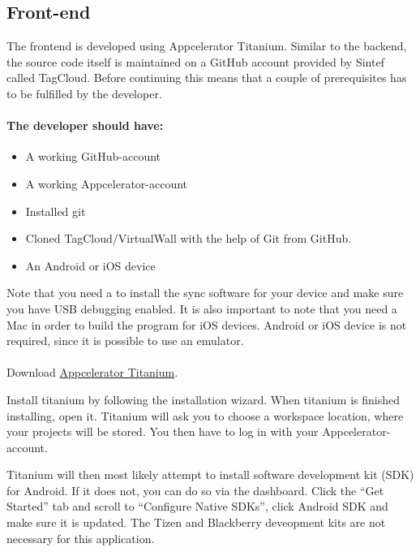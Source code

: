 \subsection{Front-end}

The frontend is developed using Appcelerator Titanium.  Similar to the backend, the source code itself is maintained on a GitHub account provided by Sintef called TagCloud. Before continuing this means that a couple of prerequisites has to be fulfilled by the developer.

\paragraph{The developer should have:}
\begin{itemize}
\item A working GitHub-account 
\item A working Appcelerator-account 
\item Installed git
\item Cloned TagCloud/VirtualWall with the help of Git from GitHub.
\item An Android or iOS device
\end{itemize}  

Note that you need a to install the sync software for your device and make sure you have USB debugging enabled. It is also important to note that you need a Mac in order to build the program for iOS devices. Android or iOS device is not required, since it is possible to use an emulator. 

\paragraph{}

Download \href{http://www.appcelerator.com/titanium/}{Appcelerator Titanium}.

Install titanium by following the installation wizard. When titanium is finished installing, open it. Titanium will ask you to choose a workspace location, where your projects will be stored. You then have to log in with your Appcelerator-account.

Titanium will then most likely attempt to install software development kit (SDK) for Android. If it does not, you can do so via the dashboard. Click the “Get Started” tab and scroll to “Configure Native SDKs”, click Android SDK and make sure it is updated. The Tizen and Blackberry deveopment kits are not necessary for this application.

